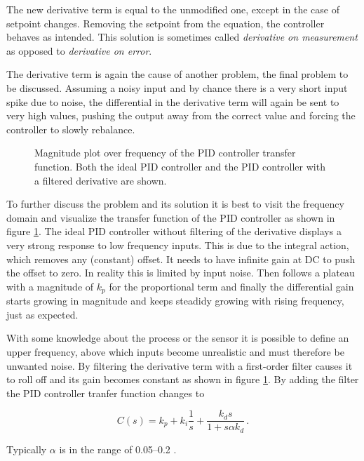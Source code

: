 The new derivative term is equal to the unmodified one, except in the case of setpoint changes. Removing the setpoint from the equation, the controller behaves as intended. This solution is sometimes called \textit{derivative on measurement} as opposed to \textit{derivative on error}.

The derivative term is again the cause of another problem, the final problem to be discussed. Assuming a noisy input and by chance there is a very short input spike due to noise, the differential in the derivative term will again be sent to very high values, pushing the output away from the correct value and forcing the controller to slowly rebalance.
\begin{figure}[hb]
    \centering
    
    \caption{Magnitude plot over frequency of the PID controller transfer function. Both the ideal PID controller and the PID controller with a filtered derivative are shown.}
    \label{fig:sim_pid_controller}
\end{figure}

To further discuss the problem and its solution it is best to visit the frequency domain and visualize the transfer function of the PID controller as shown in figure \ref{fig:sim_pid_controller}. The ideal PID controller without filtering of the derivative displays a very strong response to low frequency inputs. This is due to the integral action, which removes any (constant) offset. It needs to have infinite gain at DC to push the offset to zero. In reality this is limited by input noise. Then follows a plateau with a magnitude of $k_p$ for the proportional term and finally the differential gain starts growing in magnitude and keeps steadidy growing with rising frequency, just as expected.

With some knowledge about the process or the sensor it is possible to define an upper frequency, above which inputs become unrealistic and must therefore be unwanted noise. By filtering the derivative term with a first-order filter causes it to roll off and its gain becomes constant as shown in figure \ref{fig:sim_pid_controller}. By adding the filter the PID controller tranfer function changes to

\begin{equation}
    C(s) = k_p + k_i \frac{1}{s} + \frac{k_d s}{1 + s \alpha k_d} \,. \label{eqn:pid_controller_filtered}
\end{equation}

Typically $\alpha$ is in the range of \numrange{0.05}{0.2} \citep[p. 129]{pid_controller}.

